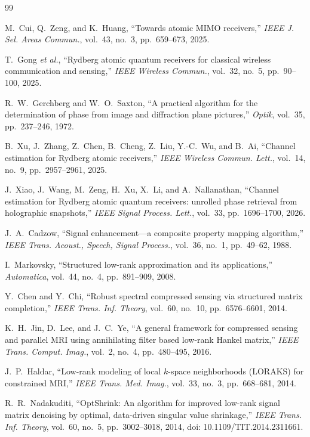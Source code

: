 \documentclass[journal]{IEEEtran}
\begin{document}
\clearpage
{}
\begin{thebibliography}{99}

M.~Cui, Q.~Zeng, and K.~Huang,
``Towards atomic MIMO receivers,''
\emph{IEEE J. Sel. Areas Commun.},
vol.~43, no.~3, pp.~659--673, 2025.

T.~Gong \emph{et al.},
``Rydberg atomic quantum receivers for classical wireless communication and sensing,''
\emph{IEEE Wireless Commun.},
vol.~32, no.~5, pp.~90--100, 2025.

R.~W.~Gerchberg and W.~O.~Saxton,
``A practical algorithm for the determination of phase from image and diffraction plane pictures,''
\emph{Optik},
vol.~35, pp.~237--246, 1972.

B.~Xu, J.~Zhang, Z.~Chen, B.~Cheng, Z.~Liu, Y.-C.~Wu, and B.~Ai,
``Channel estimation for Rydberg atomic receivers,''
\emph{IEEE Wireless Commun. Lett.},
vol.~14, no.~9, pp.~2957--2961, 2025.

J.~Xiao, J.~Wang, M.~Zeng, H.~Xu, X.~Li, and A.~Nallanathan,
``Channel estimation for Rydberg atomic quantum receivers:
unrolled phase retrieval from holographic snapshots,''
\emph{IEEE Signal Process. Lett.},
vol.~33, pp.~1696--1700, 2026.

J.~A.~Cadzow,
``Signal enhancement---a composite property mapping algorithm,''
\emph{IEEE Trans. Acoust., Speech, Signal Process.},
vol.~36, no.~1, pp.~49--62, 1988.

I.~Markovsky,
``Structured low-rank approximation and its applications,''
\emph{Automatica},
vol.~44, no.~4, pp.~891--909, 2008.

Y.~Chen and Y.~Chi,
``Robust spectral compressed sensing via structured matrix completion,''
\emph{IEEE Trans. Inf. Theory},
vol.~60, no.~10, pp.~6576--6601, 2014.

K.~H.~Jin, D.~Lee, and J.~C.~Ye,
``A general framework for compressed sensing and parallel MRI using annihilating filter based low-rank Hankel matrix,''
\emph{IEEE Trans. Comput. Imag.},
vol.~2, no.~4, pp.~480--495, 2016.

J.~P.~Haldar,
``Low-rank modeling of local $k$-space neighborhoods (LORAKS) for constrained MRI,''
\emph{IEEE Trans. Med. Imag.},
vol.~33, no.~3, pp.~668--681, 2014.

R.~R.~Nadakuditi,
``OptShrink: An algorithm for improved low-rank signal matrix denoising by
optimal, data-driven singular value shrinkage,''
\emph{IEEE Trans. Inf. Theory}, vol.~60, no.~5, pp.~3002--3018, 2014,
doi: 10.1109/TIT.2014.2311661.


\end{thebibliography}
\end{document}
